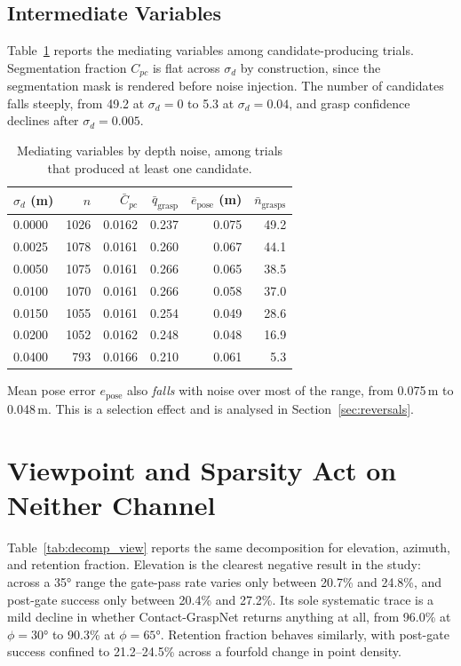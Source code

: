 \documentclass[11pt,a4paper]{report}
\begin{document}
\subsection{Intermediate Variables}

Table~\ref{tab:intermediates} reports the mediating variables among candidate-producing trials. Segmentation fraction $C_{pc}$ is flat across $\sigma_d$ by construction, since the segmentation mask is rendered before noise injection. The number of candidates falls steeply, from 49.2 at $\sigma_d = 0$ to 5.3 at $\sigma_d = 0.04$, and grasp confidence declines after $\sigma_d = 0.005$.

\begin{table}[t]
  \caption{Mediating variables by depth noise, among trials that produced at least one candidate.}
  \label{tab:intermediates}
  \centering
  \begin{tabular}{lrrrrr}
    \toprule
    $\sigma_d$ (m) & $n$ & $\bar{C}_{pc}$ & $\bar{q}_{\text{grasp}}$ & $\bar{e}_{\text{pose}}$ (m) & $\bar{n}_{\text{grasps}}$ \\
    \midrule
    0.0000 & 1026 & 0.0162 & 0.237 & 0.075 & 49.2 \\
    0.0025 & 1078 & 0.0161 & 0.260 & 0.067 & 44.1 \\
    0.0050 & 1075 & 0.0161 & 0.266 & 0.065 & 38.5 \\
    0.0100 & 1070 & 0.0161 & 0.266 & 0.058 & 37.0 \\
    0.0150 & 1055 & 0.0161 & 0.254 & 0.049 & 28.6 \\
    0.0200 & 1052 & 0.0162 & 0.248 & 0.048 & 16.9 \\
    0.0400 &  793 & 0.0166 & 0.210 & 0.061 &  5.3 \\
    \bottomrule
  \end{tabular}
\end{table}

Mean pose error $e_{\text{pose}}$ also \emph{falls} with noise over most of the range, from 0.075\,m to 0.048\,m. This is a selection effect and is analysed in Section~\ref{sec:reversals}.

\section{Viewpoint and Sparsity Act on Neither Channel}
\label{sec:viewpoint_sparsity}

Table~\ref{tab:decomp_view} reports the same decomposition for elevation, azimuth, and retention fraction. Elevation is the clearest negative result in the study: across a 35° range the gate-pass rate varies only between 20.7\% and 24.8\%, and post-gate success only between 20.4\% and 27.2\%. Its sole systematic trace is a mild decline in whether Contact-GraspNet returns anything at all, from 96.0\% at $\phi = 30°$ to 90.3\% at $\phi = 65°$. Retention fraction behaves similarly, with post-gate success confined to 21.2--24.5\% across a fourfold change in point density.
\end{document}
